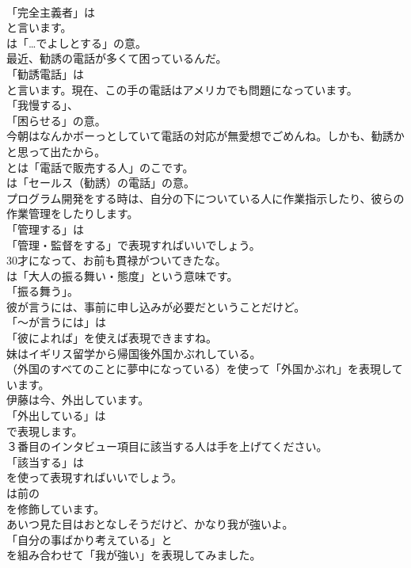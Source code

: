 \documentclass[8pt]{extreport}
\begin{document}
\begin{CJK}{UTF8}{min}
\\	「完全主義者」は 
\\	と言います。
\\	は「…でよしとする」の意。	
\\	最近、勧誘の電話が多くて困っているんだ。 
\\	「勧誘電話」は
\\	と言います。現在、この手の電話はアメリカでも問題になっています。
\\	「我慢する」、
\\	「困らせる」の意。	
\\	今朝はなんかボーっとしていて電話の対応が無愛想でごめんね。しかも、勧誘かと思って出たから。 
\\	とは「電話で販売する人」のこです。
\\	は「セールス（勧誘）の電話」の意。	
\\	プログラム開発をする時は、自分の下についている人に作業指示したり、彼らの作業管理をしたりします。 
\\	「管理する」は
\\	「管理・監督をする」で表現すればいいでしょう。	
\\	30才になって、お前も貫禄がついてきたな。 
\\	は「大人の振る舞い・態度」という意味です。
\\	「振る舞う」。	
\\	彼が言うには、事前に申し込みが必要だということだけど。 
\\	「～が言うには」は
\\	「彼によれば」を使えば表現できますね。	
\\	妹はイギリス留学から帰国後外国かぶれしている。 
\\	（外国のすべてのことに夢中になっている）を使って「外国かぶれ」を表現しています。	
\\	伊藤は今、外出しています。 
\\	「外出している」は
\\	で表現します。	
\\	３番目のインタビュー項目に該当する人は手を上げてください。 
\\	「該当する」は 
\\	を使って表現すればいいでしょう。
\\	は前の 
\\	を修飾しています。	
\\	あいつ見た目はおとなしそうだけど、かなり我が強いよ。 
\\	「自分の事ばかり考えている」と
\\	を組み合わせて「我が強い」を表現してみました。

\end{CJK}
\end{document}
